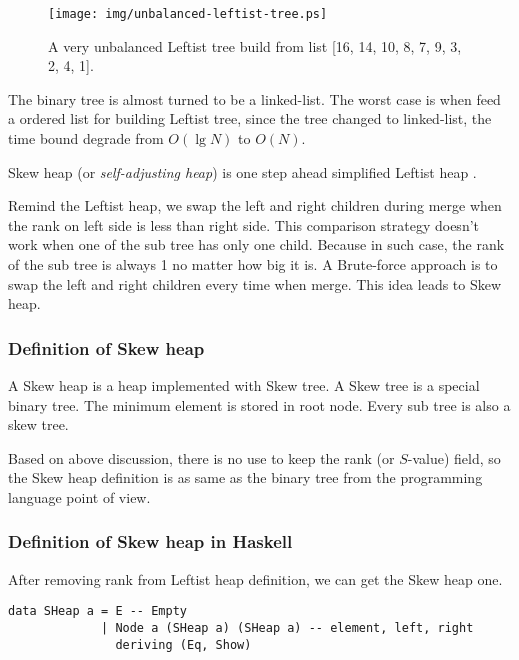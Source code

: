 \documentclass{article}
\begin{document}
\begin{figure}[htbp]
   \begin{center}
   	  \texttt{[image: img/unbalanced-leftist-tree.ps]}
    \caption{A very unbalanced Leftist tree build from list [16, 14, 10, 8, 7, 9, 3, 2, 4, 1].} \label{fig:unbalanced-leftist-tree}
   \end{center}
\end{figure}

The binary tree is almost turned to be a linked-list. The worst case
is when feed a ordered list for building Leftist tree, since the
tree changed to linked-list, the time bound degrade from $O(\lg N)$
to $O(N)$.

Skew heap (or {\em self-adjusting heap}) is one step ahead simplified Leftist heap \cite{wiki-skew-heap} \cite{self-adjusting-heaps}.

Remind the Leftist heap, we swap the left and right children during merge
when the rank on left side is less than right side. This comparison strategy
doesn't work when one of the sub tree has only one child. Because
in such case, the rank of the sub tree is always 1 no matter how
big it is. A Brute-force approach is to swap the left and right children
every time when merge. This idea leads to Skew heap.

\subsubsection{Definition of Skew heap}

A Skew heap is a heap implemented with Skew tree. A Skew tree is a special
binary tree. The minimum element is stored in root node. Every sub tree is
also a skew tree.

Based on above discussion, there is no use to keep the rank (or $S$-value)
field, so the Skew heap definition is as same as the binary tree from the
programming language point of view.

\subsubsection*{Definition of Skew heap in Haskell}

After removing rank from Leftist heap definition, we can get the Skew
heap one.

\lstset{language=Haskell}
\begin{lstlisting}
data SHeap a = E -- Empty
             | Node a (SHeap a) (SHeap a) -- element, left, right
               deriving (Eq, Show)
\end{lstlisting}
\end{document}
